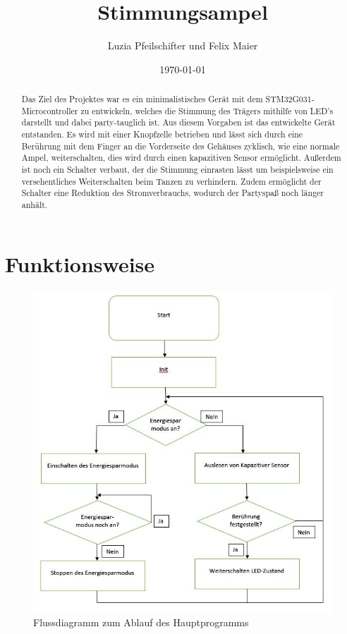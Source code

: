 \documentclass[a4paper,
DIV=13,
12pt,
BCOR=10mm,
department=FakEI,
parskip=half,
automark,
]{article}
\date{\today}
\title{Stimmungsampel}
\author{Luzia Pfeilschifter und Felix Maier}
\begin{document}
\maketitle
\cleardoublepage
\begin{abstract}
Das Ziel des Projektes war es ein minimalistisches Gerät mit dem STM32G031-Microcontroller zu entwickeln, welches die Stimmung des Trägers mithilfe von LED's darstellt und dabei party-tauglich ist. Aus diesem Vorgaben ist das entwickelte Gerät entstanden. Es wird mit einer Knopfzelle betrieben und lässt sich durch eine Berührung mit dem Finger an die Vorderseite des Gehäuses zyklisch, wie eine normale Ampel, weiterschalten, dies wird durch einen kapazitiven Sensor ermöglicht. Außerdem ist noch ein Schalter verbaut, der die \glqq Stimmung\grqq{} einrasten lässt um beispielsweise ein versehentliches Weiterschalten beim Tanzen zu verhindern. Zudem ermöglicht der Schalter eine Reduktion des Stromverbrauchs, wodurch der Partyspaß noch länger anhält.
\end{abstract}
\cleardoublepage
\tableofcontents

\cleardoublepage
\section{Funktionsweise}
\begin{figure}[!hbpt]
 \begin{center} \includegraphics[width=1.2\textwidth]{AblaufMain.jpg}
 \caption{Flussdiagramm zum Ablauf des Hauptprogramms}
 \label{fig:Register}
  \end{center}
\end{figure}
\end{document}
